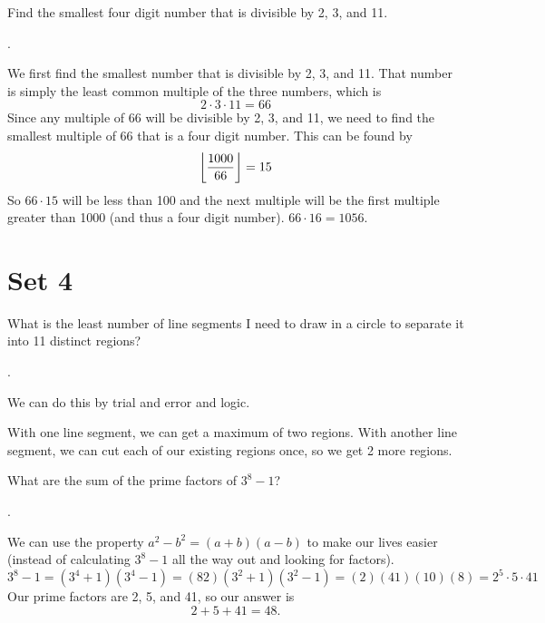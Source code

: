 \documentclass[11pt]{article}
\DeclareRobustCommand{\frac}[3][0pt]{%
  {\begingroup\hspace{#1}#2\hspace{#1}\endgroup\over\hspace{#1}#3\hspace{#1}}}
\begin{document}
\begin{problem}Find the smallest four digit number that is divisible by 2, 3, and 11.
\end{problem}
\begin{answer}
.
\end{answer}
\begin{solution}
We first find the smallest number that is divisible by 2, 3, and 11. That number is simply the least common multiple of the three numbers, which is
$$2\cdot 3\cdot 11=66$$
Since any multiple of 66 will be divisible by 2, 3, and 11, we need to find the smallest multiple of 66 that is a four digit number. This can be found by
$$\floor{\frac{1000}{66}}=15$$
So $66 \cdot 15$ will be less than 100 and the next multiple will be the first multiple greater than 1000 (and thus a four digit number). $66 \cdot 16 = \boxed{1056}.$
\end{solution}

\eject

\section*{Set 4}

\begin{problem}
What is the least number of line segments I need to draw in a circle to separate it into 11 distinct regions?
\end{problem}
\begin{answer}
.
\end{answer}
\begin{solution}
We can do this by trial and error and logic. \par
With one line segment, we can get a maximum of two regions. With another line segment, we can cut each of our existing regions once, so we get 2 more regions.
\end{solution}

\begin{problem}
What are the sum of the prime factors of $3^{8}-1$?
\end{problem}
\begin{answer}
.
\end{answer}
\begin{solution}
We can use the property $a^2-b^2 = (a+b)(a-b)$ to make our lives easier (instead of calculating $3^8-1$ all the way out and looking for factors).
$$3^8-1 = (3^4+1)(3^4-1) = (82)(3^2+1)(3^2-1)=(2)(41)(10)(8)=2^5 \cdot 5 \cdot 41$$
Our prime factors are 2, 5, and 41, so our answer is
$$2+5+41 = \boxed{48}.$$
\end{solution}
\end{document}
